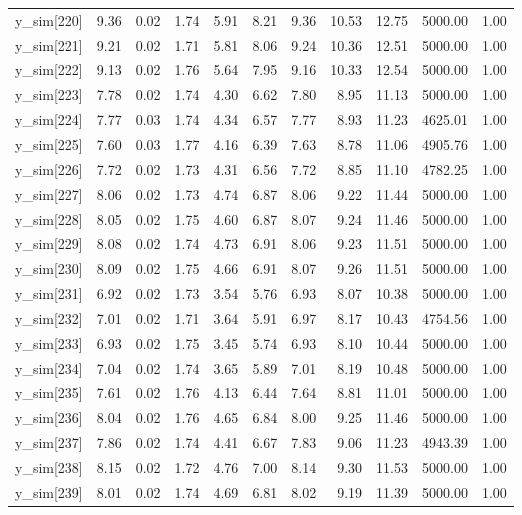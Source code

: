 \begin{table}[ht]
\begin{tabular}{rrrrrrrrrrr}
  y\_sim[220] & 9.36 & 0.02 & 1.74 & 5.91 & 8.21 & 9.36 & 10.53 & 12.75 & 5000.00 & 1.00 \\ 
  y\_sim[221] & 9.21 & 0.02 & 1.71 & 5.81 & 8.06 & 9.24 & 10.36 & 12.51 & 5000.00 & 1.00 \\ 
  y\_sim[222] & 9.13 & 0.02 & 1.76 & 5.64 & 7.95 & 9.16 & 10.33 & 12.54 & 5000.00 & 1.00 \\ 
  y\_sim[223] & 7.78 & 0.02 & 1.74 & 4.30 & 6.62 & 7.80 & 8.95 & 11.13 & 5000.00 & 1.00 \\ 
  y\_sim[224] & 7.77 & 0.03 & 1.74 & 4.34 & 6.57 & 7.77 & 8.93 & 11.23 & 4625.01 & 1.00 \\ 
  y\_sim[225] & 7.60 & 0.03 & 1.77 & 4.16 & 6.39 & 7.63 & 8.78 & 11.06 & 4905.76 & 1.00 \\ 
  y\_sim[226] & 7.72 & 0.02 & 1.73 & 4.31 & 6.56 & 7.72 & 8.85 & 11.10 & 4782.25 & 1.00 \\ 
  y\_sim[227] & 8.06 & 0.02 & 1.73 & 4.74 & 6.87 & 8.06 & 9.22 & 11.44 & 5000.00 & 1.00 \\ 
  y\_sim[228] & 8.05 & 0.02 & 1.75 & 4.60 & 6.87 & 8.07 & 9.24 & 11.46 & 5000.00 & 1.00 \\ 
  y\_sim[229] & 8.08 & 0.02 & 1.74 & 4.73 & 6.91 & 8.06 & 9.23 & 11.51 & 5000.00 & 1.00 \\ 
  y\_sim[230] & 8.09 & 0.02 & 1.75 & 4.66 & 6.91 & 8.07 & 9.26 & 11.51 & 5000.00 & 1.00 \\ 
  y\_sim[231] & 6.92 & 0.02 & 1.73 & 3.54 & 5.76 & 6.93 & 8.07 & 10.38 & 5000.00 & 1.00 \\ 
  y\_sim[232] & 7.01 & 0.02 & 1.71 & 3.64 & 5.91 & 6.97 & 8.17 & 10.43 & 4754.56 & 1.00 \\ 
  y\_sim[233] & 6.93 & 0.02 & 1.75 & 3.45 & 5.74 & 6.93 & 8.10 & 10.44 & 5000.00 & 1.00 \\ 
  y\_sim[234] & 7.04 & 0.02 & 1.74 & 3.65 & 5.89 & 7.01 & 8.19 & 10.48 & 5000.00 & 1.00 \\ 
  y\_sim[235] & 7.61 & 0.02 & 1.76 & 4.13 & 6.44 & 7.64 & 8.81 & 11.01 & 5000.00 & 1.00 \\ 
  y\_sim[236] & 8.04 & 0.02 & 1.76 & 4.65 & 6.84 & 8.00 & 9.25 & 11.46 & 5000.00 & 1.00 \\ 
  y\_sim[237] & 7.86 & 0.02 & 1.74 & 4.41 & 6.67 & 7.83 & 9.06 & 11.23 & 4943.39 & 1.00 \\ 
  y\_sim[238] & 8.15 & 0.02 & 1.72 & 4.76 & 7.00 & 8.14 & 9.30 & 11.53 & 5000.00 & 1.00 \\ 
  y\_sim[239] & 8.01 & 0.02 & 1.74 & 4.69 & 6.81 & 8.02 & 9.19 & 11.39 & 5000.00 & 1.00 \\ 

\end{tabular}
\end{table}
